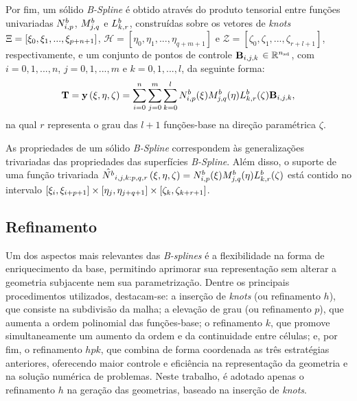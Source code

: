 Por fim, um sólido \textit{B-Spline} é obtido através do produto tensorial entre funções univariadas $N^b_{i,p}$, $M^b_{j,q}$ e $L^b_{k,r}$, construídas sobre os vetores de \textit{knots} $\Xi = \left[\xi_{0},\xi_{1},...,\xi_{p+n+1}\right]$, $\mathcal{H} = \left[\eta_{0},\eta_{1},...,\eta_{q+m+1}\right]$ e $\mathcal{Z} = \left[\zeta_{0},\zeta_{1},...,\zeta_{r+l+1}\right]$, respectivamente, e um conjunto de pontos de controle  $\mathbf{B}_{i,j,k}$ $\in \mathbb{R}^{{n_{\mathrm{sd}}}}$, com $i = 0,1,...,n$, $j = 0,1,..., m$ e $k = 0,1,..., l$, da seguinte forma:
\begin{align}
\mathbf{T} = \mathbf{y}\left(\xi,\eta,\zeta\right)  = \sum_{i=0}^{n}\sum_{j=0}^{m}\sum_{k=0}^{l}N^b_{i,p}(\xi)M^b_{j,q}(\eta)L^b_{k,r}(\zeta)\mathbf{B}_{i,j,k},
\end{align}
\noindent na qual $r$ representa o grau das $l+1$ funções-base na direção paramétrica $\zeta$.

As propriedades de um sólido \textit{B-Spline} correspondem às generalizações trivariadas das propriedades das superfícies \textit{B-Spline}. Além disso, o suporte de uma função trivariada $\hat{N^b}_{i,j,k:p,q,r}\left(\xi,\eta,\zeta\right) = N^b_{i,p}(\xi)M^b_{j,q}(\eta)L^b_{k,r}(\zeta)$ está contido no intervalo $\left[\xi_{i},\xi_{i+p+1}\right]\times\left[\eta_{j},\eta_{j+q+1}\right]\times\left[\zeta_{k},\zeta_{k+r+1}\right]$.

\subsection{Refinamento}

Um dos aspectos mais relevantes das \textit{B-splines} é a flexibilidade na forma de enriquecimento da base, permitindo aprimorar sua representação sem alterar a geometria subjacente nem sua parametrização. Dentre os principais procedimentos utilizados, destacam-se: a inserção de \textit{knots} (ou refinamento $h$), que consiste na subdivisão da malha; a elevação de grau (ou refinamento $p$), que aumenta a ordem polinomial das funções-base; o refinamento $k$, que promove simultaneamente um aumento da ordem e da continuidade entre células; e, por fim, o refinamento $hpk$, que combina de forma coordenada as três estratégias anteriores, oferecendo maior controle e eficiência na representação da geometria e na solução numérica de problemas. Neste trabalho, é adotado apenas o refinamento $h$ na geração das geometrias, baseado na inserção de \textit{knots}.


